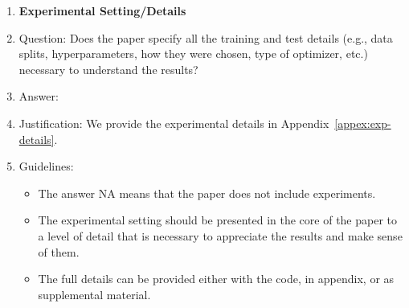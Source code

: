 \documentclass{article}
\theoremstyle{plain}
\theoremstyle{definition}
\theoremstyle{remark}
\begin{document}
\begin{enumerate}
\item {\bf Experimental Setting/Details}
    \item[] Question: Does the paper specify all the training and test details (e.g., data splits, hyperparameters, how they were chosen, type of optimizer, etc.) necessary to understand the results?
    \item[] Answer: \answerYes{} 
    \item[] Justification: We provide the experimental details in Appendix~\ref{appex:exp-details}.
    \item[] Guidelines:
    \begin{itemize}
        \item The answer NA means that the paper does not include experiments.
        \item The experimental setting should be presented in the core of the paper to a level of detail that is necessary to appreciate the results and make sense of them.
        \item The full details can be provided either with the code, in appendix, or as supplemental material.
    \end{itemize}


\end{enumerate}
\end{document}
